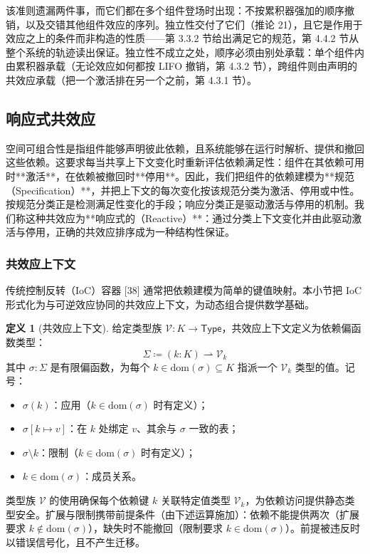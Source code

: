 \documentclass[11pt,a4paper]{article}
\theoremstyle{plain}
\theoremstyle{definition}
\newtheorem{definition}{定义}
\theoremstyle{remark}
\begin{document}
该准则遗漏两件事，而它们都在多个组件登场时出现：不按累积器强加的顺序撤销，以及交错其他组件效应的序列。独立性交付了它们（推论 21），且它是作用于效应之上的条件而非构造的性质——第 3.3.2 节给出满足它的规范，第 4.4.2 节从整个系统的轨迹读出保证。独立性不成立之处，顺序必须由别处承载：单个组件内由累积器承载（无论效应如何都按 LIFO 撤销，第 4.3.2 节），跨组件则由声明的共效应承载（把一个激活排在另一个之前，第 4.3.1 节）。

\subsection{响应式共效应}

空间可组合性是指组件能够声明彼此依赖，且系统能够在运行时解析、提供和撤回这些依赖。这要求每当共享上下文变化时重新评估依赖满足性：组件在其依赖可用时**激活**，在依赖被撤回时**停用**。因此，我们把组件的依赖建模为**规范（Specification）**，并把上下文的每次变化按该规范分类为激活、停用或中性。按规范分类正是检测满足性变化的手段；响应分类正是驱动激活与停用的机制。我们称这种共效应为**响应式的（Reactive）**：通过分类上下文变化并由此驱动激活与停用，正确的共效应排序成为一种结构性保证。

\subsubsection{共效应上下文}

传统控制反转（IoC）容器 [38] 通常把依赖建模为简单的键值映射。本小节把 IoC 形式化为与可逆效应协同的共效应上下文，为动态组合提供数学基础。

\begin{definition}[共效应上下文]
给定类型族 $\mathcal{V} : K \to \mathsf{Type}$，共效应上下文定义为依赖偏函数类型：
\[
\Sigma \coloneqq (k : K) \rightharpoonup \mathcal{V}_k \tag{20}
\]
其中 $\sigma : \Sigma$ 是有限偏函数，为每个 $k \in \mathrm{dom}(\sigma) \subseteq K$ 指派一个 $\mathcal{V}_k$ 类型的值。记号：
\begin{itemize}
\item $\sigma(k)$：应用（$k \in \mathrm{dom}(\sigma)$ 时有定义）；
\item $\sigma[k \mapsto v]$：在 $k$ 处绑定 $v$、其余与 $\sigma$ 一致的表；
\item $\sigma \setminus k$：限制（$k \in \mathrm{dom}(\sigma)$ 时有定义）；
\item $k \in \mathrm{dom}(\sigma)$：成员关系。
\end{itemize}
\end{definition}

类型族 $\mathcal{V}$ 的使用确保每个依赖键 $k$ 关联特定值类型 $\mathcal{V}_k$，为依赖访问提供静态类型安全。扩展与限制携带前提条件（由下述运算施加）：依赖不能提供两次（扩展要求 $k \notin \mathrm{dom}(\sigma)$），缺失时不能撤回（限制要求 $k \in \mathrm{dom}(\sigma)$）。前提被违反时以错误信号化，且不产生迁移。
\end{document}
